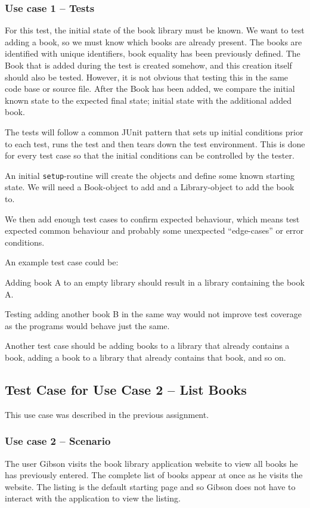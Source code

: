 \subsubsection{Use case 1 -- Tests}
For this test, the initial state of the book library must be known. We want
to test adding a book, so we must know which books are already present.
The books are identified with unique identifiers, book equality has been
previously defined.
The Book that is added during the test is created somehow, and this creation
itself should also be tested. However, it is not obvious that testing this in
the same code base or source file.
After the Book has been added, we compare the initial known state to the
expected final state; initial state with the additional added book.

The tests will follow a common JUnit pattern that sets up initial conditions
prior to each test, runs the test and then tears down the test environment.
This is done for every test case so that the initial conditions can be
controlled by the tester.

An initial \texttt{setup}-routine will create the objects and define some
known starting state. We will need a Book-object to add and a Library-object
to add the book to.

We then add enough test cases to confirm expected behaviour, which means test
expected common behaviour and probably some unexpected ``edge-cases'' or error
conditions. 

An example test case could be:

Adding book A to an empty library should result in a library containing the book A.

Testing adding another book B in the same way would not improve test coverage
as the programs would behave just the same.

Another test case should be adding books to a library that already contains a
book, adding a book to a library that already contains that book, and so on.


\subsection{Test Case for Use Case 2 -- List Books}\label{task-2b}
This use case was described in the previous assignment.

\subsubsection{Use case 2 -- Scenario}
The user Gibson visits the book library application website to view all books
he has previously entered. The complete list of books appear at once as he
visits the website. The listing is the default starting page and so Gibson does
not have to interact with the application to view the listing.


